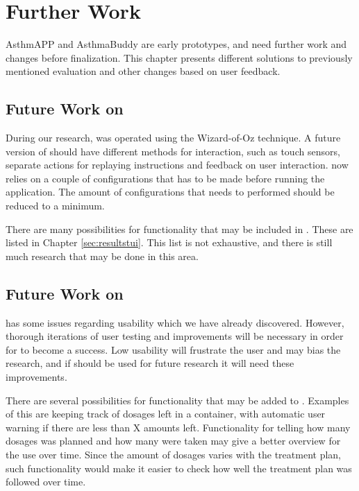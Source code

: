 \chapter{Further Work}
\label{chp:futurework}

AsthmAPP and AsthmaBuddy are early prototypes, and need further work and changes before finalization. This chapter presents different solutions to previously mentioned evaluation and other changes based on user feedback.

\section{Future Work on \ab{}}
\label{sec:futureworkab}
During our research, \ab{} was operated using the Wizard-of-Oz technique. A future version of \ab{} should have different methods for interaction, such as touch sensors, separate actions for replaying instructions and feedback on user interaction. \ab{} now relies on a couple of configurations that has to be made before running the application. The amount of configurations that needs to performed should be reduced to a minimum.  

There are many possibilities for functionality that may be included in \ab{}. These are listed in Chapter \ref{sec:resultstui}. This list is not exhaustive, and there is still much research that may be done in this area.


\section{Future Work on \app{}}
\label{sec:futureworkapp}
\app{} has some issues regarding usability which we have already discovered. However, thorough iterations of user testing and improvements will be necessary in order for \app{} to become a success. Low usability will frustrate the user and may bias the research, and if \app{} should be used for future research it will need these improvements. 

There are several possibilities for functionality that may be added to \app{}. Examples of this are keeping track of dosages left in a container, with automatic user warning if there are less than X amounts left. Functionality for telling how many dosages was planned and how many were taken may give a better overview for the use over time. Since the amount of dosages varies with the treatment plan, such functionality would make it easier to check how well the treatment plan was followed over time. 

